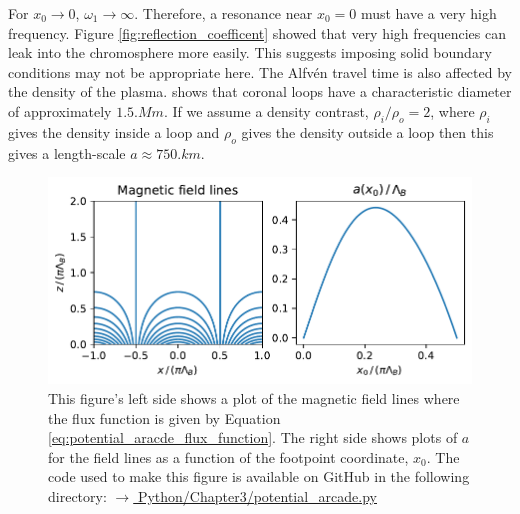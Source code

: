 For $x_0\rightarrow0$, $\omega_1\rightarrow\infty$. Therefore, a resonance near $x_0=0$ must have a very high frequency. Figure \ref{fig:reflection_coefficent} showed that very high frequencies can leak into the chromosphere more easily. This suggests imposing solid boundary conditions may not be appropriate here.
The Alfv\'en travel time is also affected by the density of the plasma. \citet{Klimchuk2015} shows that coronal loops have a characteristic diameter of approximately $1.5\si{.Mm}$. If we assume a density contrast, $\rho_i/\rho_o=2$, \citep{Hood2013,Pascoe2013} where $\rho_i$ gives the density inside a loop and $\rho_o$ gives the density outside a loop then this gives a length-scale $a\approx750\si{.km}$.

\begin{figure}
    \centering
    \vspace{-20pt}
    \includegraphics[width=\textwidth,height=0.8\textheight,keepaspectratio]{figures/chapter03/potential_arcade.pdf}
    \vspace{-30pt}
    \caption{This figure's left side shows a plot of the magnetic field lines where the flux function is given by Equation \eqref{eq:potential_aracde_flux_function}. The right side shows plots of $a$ for the field lines as a function of the footpoint coordinate, $x_0$. The code used to make this figure is available on GitHub in the following directory:\newline
    \href{https://github.com/aleksyprok/apkp_thesis/blob/main/Python/Chapter3/potential_arcade.py}{$\rightarrow$ Python/Chapter3/potential\_arcade.py}}
    \vspace{-10pt}
    \label{fig:potential_arcade}
\end{figure}

